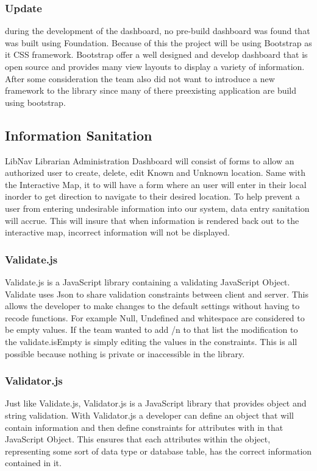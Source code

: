 \documentclass[letterpaper,10pt,titlepage, onecolumn, compsoc]{IEEEtran}
\begin{document}
\subsubsection{Update} during the development of the dashboard, no pre-build dashboard was found that was built using Foundation. Because of this the project will be using Bootstrap as it CSS framework. Bootstrap offer a well designed and develop dashboard that is open source and provides many view layouts to display a variety of information. After some consideration the team also did not want to introduce a new framework to the library since many of there preexisting application are build using bootstrap. 

\subsection{Information Sanitation}
LibNav Librarian Administration Dashboard will consist of forms to allow an authorized user to create, delete, edit Known and Unknown location. Same with the Interactive Map, it to will have a form where an user will enter in their local inorder to get direction to navigate to their desired location. To help prevent a user from entering undesirable information into our system, data entry sanitation will accrue. This will insure that when information is rendered back out to the interactive map, incorrect information will not be displayed.

\subsubsection{Validate.js}
Validate.js is a JavaScript library containing a validating JavaScript Object. Validate uses Json to share validation constraints between client and server. This allows the developer to make changes to the default settings without having to recode functions. For example Null, Undefined and whitespace are considered to be empty values. If the team wanted to add /n to that list the modification to the validate.isEmpty is simply editing the values in the constraints. This is all possible because nothing is private or inaccessible in the library.\cite{validate.js2016}

\subsubsection{Validator.js}
Just like Validate.js, Validator.js is a JavaScript library that provides object and string validation. With Validator.js a developer can define an object that will contain information and then define constraints for attributes  with in that JavaScript Object. This ensures that each attributes within the object, representing some sort of data type or database table, has the correct information contained in it. \cite{validator.js2016}
\end{document}
